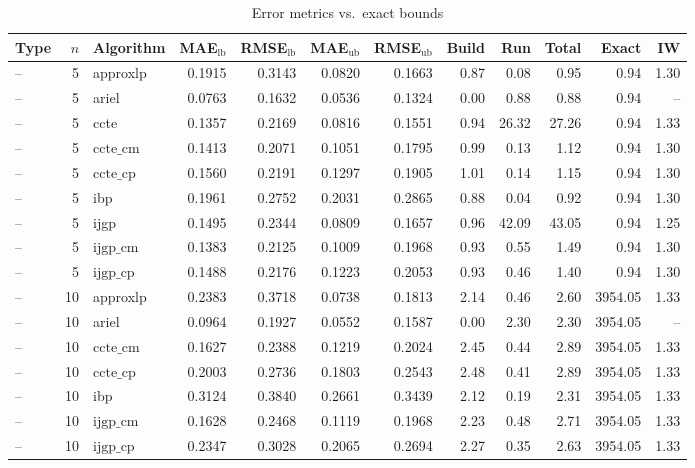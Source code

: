 \begin{table}[ht]
\centering
\scriptsize
\caption{Error metrics vs.\ exact bounds}
\begin{tabular}{lrlrrrrrrrrr}
\toprule
Type & $n$ & Algorithm & MAE$_{\text{lb}}$ & RMSE$_{\text{lb}}$ & MAE$_{\text{ub}}$ & RMSE$_{\text{ub}}$ & Build & Run & Total & Exact & IW \\
\midrule
-- & 5 & approxlp & 0.1915 & 0.3143 & 0.0820 & 0.1663 & 0.87 & 0.08 & 0.95 & 0.94 & 1.30 \\
-- & 5 & ariel & 0.0763 & 0.1632 & 0.0536 & 0.1324 & 0.00 & 0.88 & 0.88 & 0.94 & -- \\
-- & 5 & ccte & 0.1357 & 0.2169 & 0.0816 & 0.1551 & 0.94 & 26.32 & 27.26 & 0.94 & 1.33 \\
-- & 5 & $\text{ccte\_cm}$ & 0.1413 & 0.2071 & 0.1051 & 0.1795 & 0.99 & 0.13 & 1.12 & 0.94 & 1.30 \\
-- & 5 & $\text{ccte\_cp}$ & 0.1560 & 0.2191 & 0.1297 & 0.1905 & 1.01 & 0.14 & 1.15 & 0.94 & 1.30 \\
-- & 5 & ibp & 0.1961 & 0.2752 & 0.2031 & 0.2865 & 0.88 & 0.04 & 0.92 & 0.94 & 1.30 \\
-- & 5 & ijgp & 0.1495 & 0.2344 & 0.0809 & 0.1657 & 0.96 & 42.09 & 43.05 & 0.94 & 1.25 \\
-- & 5 & $\text{ijgp\_cm}$ & 0.1383 & 0.2125 & 0.1009 & 0.1968 & 0.93 & 0.55 & 1.49 & 0.94 & 1.30 \\
-- & 5 & $\text{ijgp\_cp}$ & 0.1488 & 0.2176 & 0.1223 & 0.2053 & 0.93 & 0.46 & 1.40 & 0.94 & 1.30 \\
-- & 10 & approxlp & 0.2383 & 0.3718 & 0.0738 & 0.1813 & 2.14 & 0.46 & 2.60 & 3954.05 & 1.33 \\
-- & 10 & ariel & 0.0964 & 0.1927 & 0.0552 & 0.1587 & 0.00 & 2.30 & 2.30 & 3954.05 & -- \\
-- & 10 & $\text{ccte\_cm}$ & 0.1627 & 0.2388 & 0.1219 & 0.2024 & 2.45 & 0.44 & 2.89 & 3954.05 & 1.33 \\
-- & 10 & $\text{ccte\_cp}$ & 0.2003 & 0.2736 & 0.1803 & 0.2543 & 2.48 & 0.41 & 2.89 & 3954.05 & 1.33 \\
-- & 10 & ibp & 0.3124 & 0.3840 & 0.2661 & 0.3439 & 2.12 & 0.19 & 2.31 & 3954.05 & 1.33 \\
-- & 10 & $\text{ijgp\_cm}$ & 0.1628 & 0.2468 & 0.1119 & 0.1968 & 2.23 & 0.48 & 2.71 & 3954.05 & 1.33 \\
-- & 10 & $\text{ijgp\_cp}$ & 0.2347 & 0.3028 & 0.2065 & 0.2694 & 2.27 & 0.35 & 2.63 & 3954.05 & 1.33 \\
\bottomrule
\end{tabular}
\end{table}
